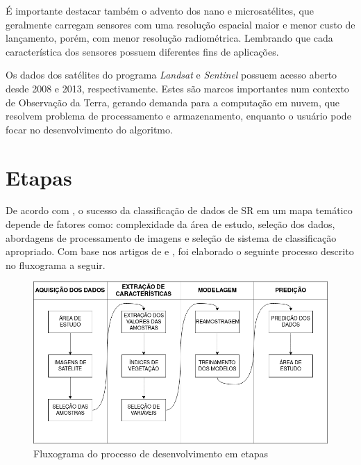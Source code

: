 É importante destacar também o advento dos nano e microsatélites, que
geralmente carregam sensores com uma resolução espacial maior e menor
custo de lançamento, porém, com menor resolução radiométrica. Lembrando
que cada característica dos sensores possuem diferentes fins de
aplicações.

Os dados dos satélites do programa \emph{Landsat} e \emph{Sentinel}
possuem acesso aberto desde 2008 e 2013, respectivamente. Estes são
marcos importantes num contexto de Observação da Terra, gerando demanda para a computação em nuvem, que resolvem problema de processamento e
armazenamento, enquanto o usuário pode focar no desenvolvimento do
algoritmo. \cite{wulder2014satellites}

\section{Etapas}\label{etapas}

	De acordo com \cite{lu-weng}, o sucesso da classificação de dados de SR em
um mapa temático depende de fatores como: complexidade da área de
estudo, seleção dos dados, abordagens de processamento de imagens e
seleção de sistema de classificação apropriado. Com base nos artigos de
\cite{lu-weng} e \cite{maxwell}, foi elaborado o seguinte processo descrito no fluxograma a seguir.

\begin{figure}[htbp]
    \centering
    \caption{Fluxograma do processo de desenvolvimento em etapas} \label{fig-fluxograma}
    \includegraphics[scale=0.55]{figs/etapas.png}
\end{figure}
